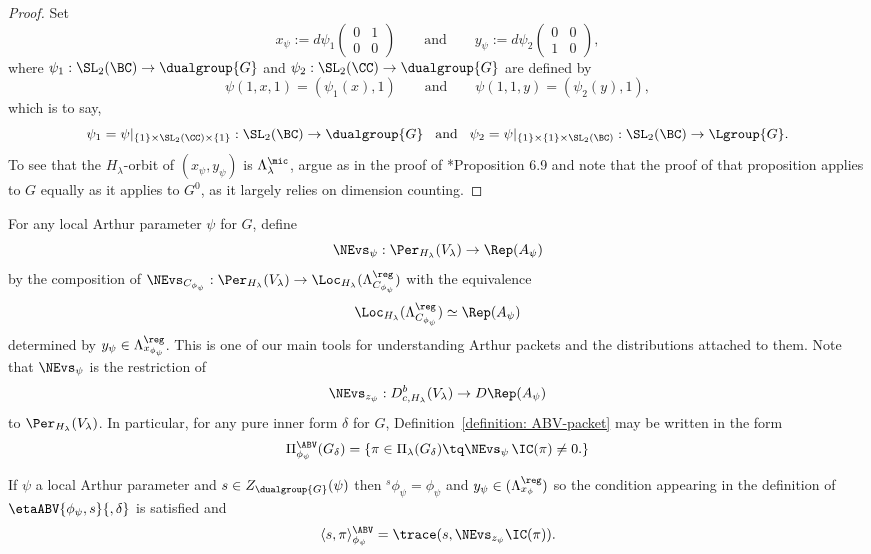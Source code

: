 \documentclass[11pt,letterpaper]{amsart}
\numberwithin{equation}{section}
\begin{document}
\begin{proof}
    Set
\begin{equation}
\label{equation: x psi y psi regular}
 x_{\psi}:=d\psi_1\begin{pmatrix}
        0&1\\0&0
    \end{pmatrix} \qquad\text{and}\qquad y_{\psi}:=d\psi_2\begin{pmatrix}
        0&0\\1&0
    \end{pmatrix},
\end{equation}
where $\psi_1 : \SL_2(\BC) \to \dualgroup{G}$ and $\psi_2 : \SL_2(\CC) \to \dualgroup{G}$ are defined by 
\[
\psi(1,x,1) = (\psi_1(x),1)
\qquad
\textrm{and}
\qquad
\psi(1,1,y) = (\psi_2(y),1),
\]
which is to say,
\[\psi_1=\psi\vert_{\{1\}\times \SL_2(\CC)\times \{1\}}: \SL_2(\BC) \to \dualgroup{G} \hspace{0.3cm}\text{and}\hspace{0.3cm} \psi_2=\psi\vert_{\{1\}\times \{1\}\times \SL_2(\BC)}: \SL_2(\BC) \to \Lgroup{G}.
\]
To see that the $H_\lambda$-orbit of $(x_\psi,y_\psi)$ is $\Lambda^\mic_\lambda$, argue as in the proof of \cite{CFMMX22}*{Proposition 6.9} and note that the proof of that proposition applies to $G$ equally as it applies to $G^0$, as it largely relies on dimension counting.
\end{proof}

For any local Arthur parameter $\psi$ for $G$, define
\[
\NEvs_{\psi} : \Per_{H_\lambda}(V_\lambda) \to \Rep(A_\psi)
\]
by the composition of $\NEvs_{C_{\phi_\psi}} : \Per_{H_\lambda}(V_\lambda) \to \Loc_{H_\lambda}(\Lambda^\reg_{C_{\phi_\psi}})$ with the equivalence 
\[
\Loc_{H_\lambda}(\Lambda_{C_{\phi_\psi}}^\reg) \simeq \Rep(A_\psi)
\]
determined by $y_\psi \in \Lambda_{x_{\phi_\psi}}^\reg$.
This is one of our main tools for understanding Arthur packets and the distributions attached to them.
Note that $\NEvs_\psi$ is the restriction of 
\[
\NEvs_{z_\psi}
: 
D^b_{c,H_\lambda}(V_\lambda) \to D \Rep(A_\psi)
\]
to $\Per_{H_\lambda}(V_\lambda)$.
In particular, for any pure inner form $\delta$ for $G$, Definition~\ref{definition: ABV-packet} may be written in the form
\[
\Pi^\ABV_{\phi_\psi}(G_\delta)
=
\{
\pi \in \Pi_\lambda(G_\delta) 
\tq
\NEvs_\psi\, \IC(\pi) \ne 0.
\}
\]


If $\psi$ a local Arthur parameter and $s\in Z_{\dualgroup{G}}(\psi)$ then
${}^{s}\phi_\psi = \phi_\psi$ and $y_\psi \in (\Lambda^\reg_{x_\phi})$ so the condition appearing in the definition of $\etaABV{\phi_\psi,s}{,\delta}$ is satisfied and
\[
\langle s,\pi\rangle_{\phi_\psi}^\ABV 
=
\trace(s, \NEvs_{z_\psi}\IC(\pi)).
\]
\end{document}
